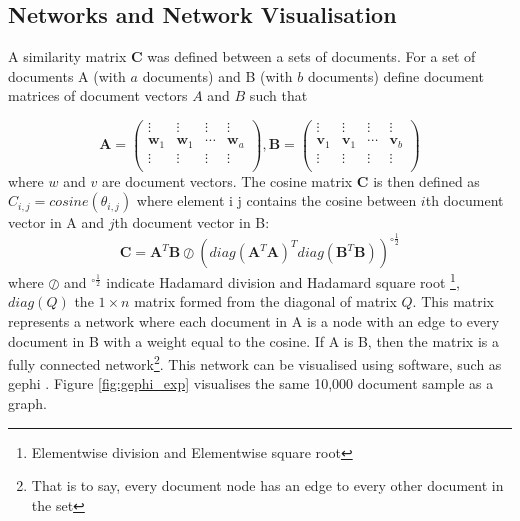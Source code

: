 \subsection{Networks and Network Visualisation}
\label{sec:COSINEMAT}
A similarity matrix $\mathbf{C}$ was defined between a sets of documents. For a set of documents  A (with $a$ documents) and B (with $b$ documents) define document matrices of document vectors $A$ and $B$ such that 

$$\mathbf{A} = \left( \begin{array}{cccc}
\vdots & \vdots & \vdots & \vdots \\
\mathbf{w}_1 & \mathbf{w}_1 & \cdots & \mathbf{w}_a \\
\vdots & \vdots & \vdots & \vdots \\ \end{array} \right) , \mathbf{B} = \left( \begin{array}{cccc}
\vdots & \vdots & \vdots & \vdots \\
\mathbf{v}_1 & \mathbf{v}_1 & \cdots & \mathbf{v}_b \\
\vdots & \vdots & \vdots & \vdots \\ \end{array} \right)$$ where $w$ and $v$ are document vectors.
The cosine matrix $\mathbf{C}$ is then defined as $C_{i,j} = cosine \left(\theta_{i,j} \right)$ where element i j contains the cosine between $i$th document vector in A and $j$th document vector in B:
$$\mathbf{C}=\mathbf{A}^T \mathbf{B} \oslash \left( diag(\mathbf{A}^T \mathbf{A})^T diag(\mathbf{B}^T \mathbf{B}) \right)^{\circ\frac12}$$
where $\oslash$ and $^{\circ\frac12}$ indicate Hadamard division and Hadamard square root \footnote{Elementwise division and Elementwise square root}, $diag(Q)$ the $1 \times n$ matrix formed from the diagonal of matrix $Q$. This matrix represents a network where each document in A is a node with an edge to every document in B with a weight equal to the cosine. If A is B, then the matrix is a fully connected network\footnote{That is to say, every document node has an edge to every other document in the set}. This network can be visualised using software, such as gephi \cite{gephi}. Figure \ref{fig:gephi_exp} visualises the same 10,000 document sample as a graph.
